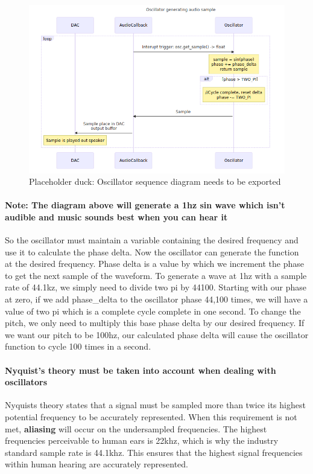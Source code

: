\documentclass[acmlarge,screen]{acmart}
\begin{document}
	\begin{figure}
		\includegraphics[width=\linewidth]{oscillator_sequence_diagram}
		\caption{Placeholder duck: Oscillator sequence diagram needs to be exported}
		\centering
	\end{figure}

	\paragraph{Note: The diagram above will generate a 1hz sin wave which isn't audible and music sounds best when you can hear it} So the oscillator must maintain a variable containing the desired frequency and use it to calculate the phase delta. Now the oscillator can generate the function at the desired frequency. Phase delta is a value by which we increment the phase to get the next sample of the waveform. To generate a wave at 1hz with a sample rate of 44.1kz, we simply need to divide two pi by 44100. Starting with our phase at zero, if we add phase\_delta to the oscillator phase 44,100 times, we will have a value of two pi which is a complete cycle complete in one second. To change the pitch, we only need to multiply this base phase delta by our desired frequency. If we want our pitch to be 100hz, our calculated phase delta will cause the oscillator function to cycle 100 times in a second. 
	
	\paragraph{\textbf{Nyquist's theory} must be taken into account when dealing with oscillators} Nyquists theory states that a signal must be sampled more than twice its highest potential frequency to be accurately represented. When this requirement is not met, \textbf{aliasing} will occur on the undersampled frequencies. The highest frequencies perceivable to human ears is 22khz, which is why the industry standard sample rate is 44.1khz. This ensures that the highest signal frequencies within human hearing are accurately represented.
\end{document}
